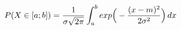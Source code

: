 \documentclass[preview]{standalone}
\begin{document}
\begin{align*}
P( X \in [a;b] ) = { \frac{1}{\sigma \sqrt{2\pi}} } \int_a^b { exp\Big(-{ {(x - m)^2} \over {2 \sigma^2} }\Big) } \, dx
\end{align*}
\end{document}
